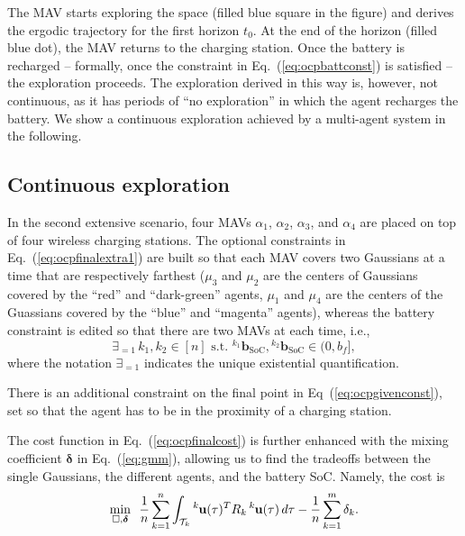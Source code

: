 \documentclass[lettersize,journal,twoside]{IEEEtran}
\theoremstyle{definition}
\begin{document}
The MAV starts exploring the space (filled blue square in the figure) and derives the ergodic trajectory for the first horizon $t_0$. At the end of the horizon (filled blue dot), the MAV returns to the charging station. Once the battery is recharged -- formally, once the constraint in Eq.~(\ref{eq:ocpbattconst}) is satisfied -- the exploration proceeds. The exploration derived in this way is, however, not continuous, as it has periods of ``no exploration'' in which the agent recharges the battery. We show a continuous exploration achieved by a multi-agent system in the following.

\subsection*{Continuous exploration}
\noindent
In the second extensive scenario, four MAVs $\alpha_1$, $\alpha_2$, $\alpha_3$, and $\alpha_4$ are placed on top of four wireless charging stations. The optional constraints in Eq.~(\ref{eq:ocpfinalextra1}) are built so that each MAV covers two Gaussians at a time that are respectively farthest ($\mu_3$ and $\mu_2$ are the centers of Gaussians covered by the ``red'' and ``dark-green'' agents, $\mu_1$ and $\mu_4$ are the centers of the Guassians covered by the ``blue'' and ``magenta'' agents), whereas the battery constraint is edited so that there are two MAVs at each time, i.e.,
\begin{equation}
\exists_{=1}\, k_1,k_2\in[n]\text{ s.t. }{}^{k_1} \mathbf{b}_{\text{SoC}},{}^{k_2} \mathbf{b}_{\text{SoC}}\in(0,b_f],
\end{equation} 
where the notation $\exists_{=1}$ indicates the unique existential quantification.

There is an additional constraint on the final point in Eq~(\ref{eq:ocpgivenconst}), set so that the agent has to be in the proximity of a charging station. %

The cost function in Eq.~(\ref{eq:ocpfinalcost}) is further enhanced with the mixing coefficient $\boldsymbol{\delta}$ in Eq.~(\ref{eq:gmm}), allowing us to find the tradeoffs between the single Gaussians, the different agents, and the battery SoC. Namely, the cost is
\begin{equation}
  \min_{\square,\boldsymbol{\delta}}\,\,\,{\frac{1}{n}\sum_{k=1}^{n}\int_{\mathcal{T}_k}{}^k\hspace*{-.1ex}\mathbf{u}(\tau)^TR_k\,{}^k\hspace*{-.1ex}\mathbf{u}(\tau)\,d\tau-\frac{1}{n}\sum_{k=1}^{m}\delta_k}.
\end{equation}
\end{document}
